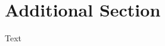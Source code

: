 \documentclass[sigconf]{acmart}
\begin{document}



\appendix

\section{Additional Section}
Text

\end{document}
